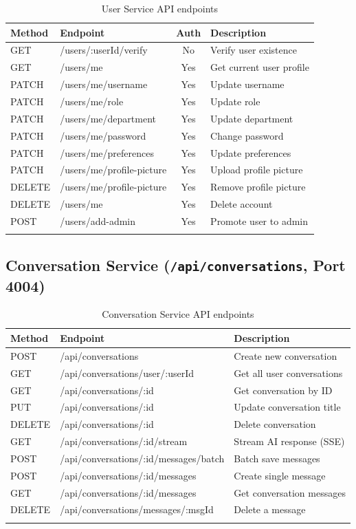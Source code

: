 \documentclass[a4paper,12pt]{report}
\begin{document}
\begin{longtable}{llcp{5.5cm}}
    \toprule
    \textbf{Method} & \textbf{Endpoint} & \textbf{Auth} & \textbf{Description} \\
    \midrule
    \endhead
    GET & /users/:userId/verify & No & Verify user existence \\
    GET & /users/me & Yes & Get current user profile \\
    PATCH & /users/me/username & Yes & Update username \\
    PATCH & /users/me/role & Yes & Update role \\
    PATCH & /users/me/department & Yes & Update department \\
    PATCH & /users/me/password & Yes & Change password \\
    PATCH & /users/me/preferences & Yes & Update preferences \\
    PATCH & /users/me/profile-picture & Yes & Upload profile picture \\
    DELETE & /users/me/profile-picture & Yes & Remove profile picture \\
    DELETE & /users/me & Yes & Delete account \\
    POST & /users/add-admin & Yes & Promote user to admin \\
    \bottomrule
\caption{User Service API endpoints}
\end{longtable}

\subsection{Conversation Service (\texttt{/api/conversations}, Port 4004)}

\begin{longtable}{lp{5cm}p{5.5cm}}
    \toprule
    \textbf{Method} & \textbf{Endpoint} & \textbf{Description} \\
    \midrule
    \endhead
    POST & /api/conversations & Create new conversation \\
    GET & /api/conversations/user/:userId & Get all user conversations \\
    GET & /api/conversations/:id & Get conversation by ID \\
    PUT & /api/conversations/:id & Update conversation title \\
    DELETE & /api/conversations/:id & Delete conversation \\
    GET & /api/conversations/:id/stream & Stream AI response (SSE) \\
    POST & /api/conversations/:id/messages/batch & Batch save messages \\
    POST & /api/conversations/:id/messages & Create single message \\
    GET & /api/conversations/:id/messages & Get conversation messages \\
    DELETE & /api/conversations/messages/:msgId & Delete a message \\
    \bottomrule
\caption{Conversation Service API endpoints}
\end{longtable}
\end{document}

